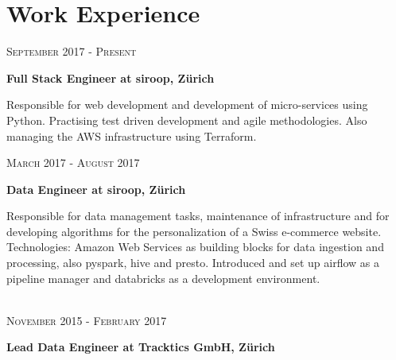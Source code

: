 \documentclass[10pt]{article} %
\begin{document}
\begin{minipage}[t]{0.5\textwidth} %
\vspace{0pt} %
	





\section{Work Experience} 

{\raggedleft\textsc{September 2017 - Present}\par}

{\raggedright\large \textbf{Full Stack Engineer at siroop, Z\"urich}\\
}

\normalsize{Responsible for web development and development of micro-services using Python. Practising test driven development and agile methodologies. Also managing the AWS infrastructure using Terraform.}
\\
{\raggedleft\textsc{March 2017 - August 2017}\par}

{\raggedright\large \textbf{Data Engineer at siroop, Z\"urich}\\
}

\normalsize{Responsible for data management tasks, maintenance of infrastructure and for developing algorithms for the personalization of a Swiss e-commerce website. Technologies: Amazon Web Services as building blocks for data ingestion and processing, also pyspark, hive and presto. Introduced and set up airflow as a pipeline manager and databricks as a development environment.}
\\
\\
{\raggedleft\textsc{November 2015 - February 2017}\par}

{\raggedright\large \textbf{Lead Data Engineer at Tracktics GmbH, Z\"urich}\\
}


\end{minipage}
\end{document}
